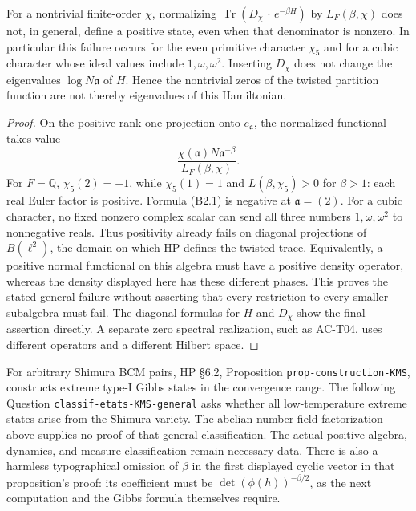 \begin{proposition}
\label{AC-B02}
For a nontrivial finite-order $\chi$, normalizing
$\operatorname{Tr}(D_\chi\,\cdot\,e^{-\beta H})$ by
$L_F(\beta,\chi)$ does not, in general, define a positive state,
even when that denominator is nonzero. In particular this failure
occurs for the even primitive character $\chi_5$ and for a cubic
character whose ideal values include $1,\omega,\omega^2$.
Inserting $D_\chi$ does not change the eigenvalues $\log N\mathfrak a$
of $H$. Hence the nontrivial zeros of the twisted partition
function are not thereby eigenvalues of this Hamiltonian.
\end{proposition}
\begin{proof}
On the positive rank-one projection onto $e_{\mathfrak a}$, the
normalized functional takes value
\[
 \frac{\chi(\mathfrak a)N\mathfrak a^{-\beta}}
      {L_F(\beta,\chi)}.                                    \tag{B2.1}
\]
For $F=\mathbb Q$, $\chi_5(2)=-1$, while $\chi_5(1)=1$ and
$L(\beta,\chi_5)>0$ for $\beta>1$: each real Euler factor is
positive. Formula (B2.1) is negative at $\mathfrak a=(2)$.
For a cubic character, no fixed nonzero complex scalar can send
all three numbers $1,\omega,\omega^2$ to nonnegative reals.
Thus positivity already fails on diagonal projections of
$B(\ell^2)$, the domain on which HP defines the twisted trace.
Equivalently, a positive normal functional on this algebra must
have a positive density operator, whereas the density displayed
here has these different phases. This proves the stated general
failure without asserting that every restriction to every smaller
subalgebra must fail. The diagonal formulas for $H$ and $D_\chi$
show the final assertion directly. A separate zero spectral
realization, such as AC-T04, uses different operators and a
different Hilbert space.
\end{proof}

For arbitrary Shimura BCM pairs, HP \S6.2,
Proposition \texttt{prop-construction-KMS}, constructs extreme
type-I Gibbs states in the convergence range. The following
Question \texttt{classif-etats-KMS-general} asks whether all
low-temperature extreme states arise from the Shimura variety.
The abelian number-field factorization above supplies no proof
of that general classification. The actual positive algebra,
dynamics, and measure classification remain necessary data.
There is also a harmless typographical omission of $\beta$ in
the first displayed cyclic vector in that proposition's proof:
its coefficient must be $\det(\phi(h))^{-\beta/2}$, as the
next computation and the Gibbs formula themselves require.

